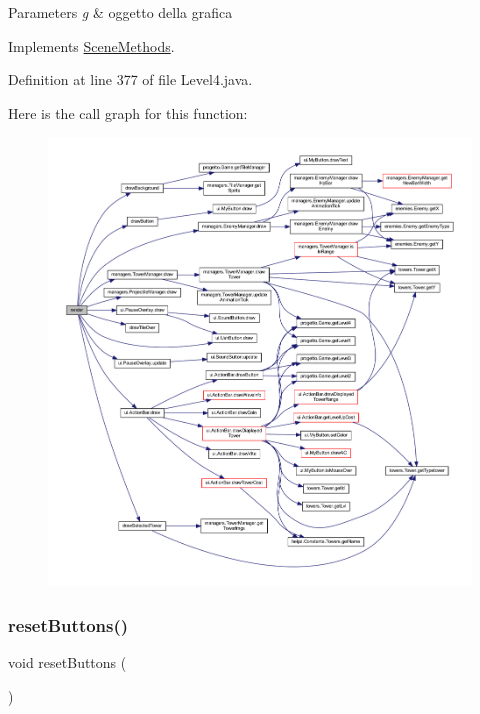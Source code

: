 \begin{DoxyParams}{Parameters}
{\em g} & oggetto della grafica \\
\hline
\end{DoxyParams}


Implements \hyperlink{interfacescenes_1_1_scene_methods_a203b6ad9d5e4d54dd1152986eec4dedc}{Scene\+Methods}.



Definition at line 377 of file Level4.\+java.

Here is the call graph for this function\+:\nopagebreak
\begin{figure}[H]
\begin{center}
\leavevmode
\includegraphics[width=350pt]{classscenes_1_1_level4_a203b6ad9d5e4d54dd1152986eec4dedc_cgraph}
\end{center}
\end{figure}
\mbox{\label{classscenes_1_1_level4_a548cf4795e9d559d0c0cce0bb57a5251}} 
\subsubsection{\texorpdfstring{reset\+Buttons()}{resetButtons()}}
{\footnotesize\ttfamily void reset\+Buttons (\begin{DoxyParamCaption}{ }\end{DoxyParamCaption})\hspace{0.3cm}{\ttfamily [private]}}




